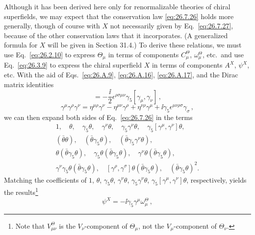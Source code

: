 Although it has been derived here only for renormalizable theories of chiral
superfields, we may expect that the conservation law \eqref{eq:26.7.26}
holds more generally, though of course with \(X\) not necessarily given by
Eq.~\eqref{eq:26.7.27}, because of the other conservation laws that it
incorporates. (A generalized formula for \(X\) will be given in Section
31.4.) To derive these relations, we must use Eq.~\eqref{eq:26.2.10} to
express \(\Theta_\mu\) in terms of components \(C_\mu^\Theta\),
\(\omega_\mu^\Theta\), etc.\ and use Eq.~\eqref{eq:26.3.9} to express the
chiral superfield \(X\) in terms of components \(A^X\), \(\psi^X\), etc.
With the aid of Eqs.~\eqref{eq:26.A.9}, \eqref{eq:26.A.16},
\eqref{eq:26.A.17}, and the Dirac matrix identities
\begin{equation}
  [\gamma^\rho,\gamma^\sigma]
  =-\frac{\ii}{2}\epsilon^{\rho\sigma\mu\nu}\gamma_5
   [\gamma_\mu,\gamma_\nu]\,,
  \tag{26.7.28}\label{eq:26.7.28}
\end{equation}
\begin{equation}
  \gamma^\mu\gamma^\rho\gamma^\nu
  =\eta^{\mu\rho}\gamma^\nu
   -\eta^{\mu\nu}\gamma^\rho
   +\eta^{\nu\rho}\gamma^\mu
   +\ii\gamma_5\epsilon^{\mu\nu\rho\sigma}\gamma_\sigma\,,
  \tag{26.7.29}\label{eq:26.7.29}
\end{equation}
we can then expand both sides of Eq.~\eqref{eq:26.7.26} in the terms
\[
  \begin{gathered}
  1,\quad \theta,\quad \gamma_5\theta,\quad \gamma^\nu\theta,\quad
  \gamma_5\gamma^\nu\theta,\quad
  \gamma_5[\gamma^\mu,\gamma^\nu]\theta,\\
  (\bar\theta\theta),\quad
  (\bar\theta\gamma_5\theta),\quad
  (\bar\theta\gamma_5\gamma^\nu\theta),\\
  \theta(\bar\theta\gamma_5\theta),\quad
  \gamma_5\theta(\bar\theta\gamma_5\theta),\quad
  \gamma^\nu\theta(\bar\theta\gamma_5\theta),\\
  \gamma^\nu\gamma_5\theta(\bar\theta\gamma_5\theta),\quad
  [\gamma^\rho,\gamma^\sigma]\theta
    (\bar\theta\gamma_5\theta),\quad
  (\bar\theta\gamma_5\theta)^2 .
  \end{gathered}
\]
Matching the coefficients of \(1\), \(\theta\), \(\gamma_5\theta\),
\(\gamma^\nu\theta\), \(\gamma_5\gamma^\nu\theta\),
\(\gamma_5[\gamma^\mu,\gamma^\nu]\theta\), respectively, yields the
results\footnote{Note that \(V_{\mu\nu}^\Theta\) is the
\(V_\nu\)-component of \(\Theta_\mu\), not the \(V_\mu\)-component of
\(\Theta_\nu\).}
\begin{equation}
  \psi^X=-\ii\gamma_5\gamma^\mu\omega_\mu^\Theta\,,
  \tag{26.7.30}\label{eq:26.7.30}
\end{equation}

